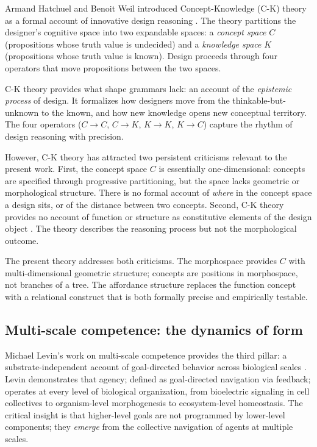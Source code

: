 Armand Hatchuel and Benoit Weil introduced Concept-Knowledge (C-K) theory as a formal account of innovative design reasoning \parencite{Hatchuel2003, Hatchuel2009}. The theory partitions the designer's cognitive space into two expandable spaces: a \textit{concept space} $C$ (propositions whose truth value is undecided) and a \textit{knowledge space} $K$ (propositions whose truth value is known). Design proceeds through four operators that move propositions between the two spaces.

C-K theory provides what shape grammars lack: an account of the \textit{epistemic process} of design. It formalizes how designers move from the thinkable-but-unknown to the known, and how new knowledge opens new conceptual territory. The four operators ($C \to C$, $C \to K$, $K \to K$, $K \to C$) capture the rhythm of design reasoning with precision.

However, C-K theory has attracted two persistent criticisms relevant to the present work. First, the concept space $C$ is essentially one-dimensional: concepts are specified through progressive partitioning, but the space lacks geometric or morphological structure. There is no formal account of \textit{where} in the concept space a design sits, or of the distance between two concepts. Second, C-K theory provides no account of function or structure as constitutive elements of the design object \parencite{Hatchuel2009}. The theory describes the reasoning process but not the morphological outcome.

The present theory addresses both criticisms. The morphospace provides $C$ with multi-dimensional geometric structure; concepts are positions in morphospace, not branches of a tree. The affordance structure replaces the function concept with a relational construct that is both formally precise and empirically testable.

\subsection{Multi-scale competence: the dynamics of form}

Michael Levin's work on multi-scale competence provides the third pillar: a substrate-independent account of goal-directed behavior across biological scales \parencite{Levin2022}. Levin demonstrates that agency; defined as goal-directed navigation via feedback; operates at every level of biological organization, from bioelectric signaling in cell collectives to organism-level morphogenesis to ecosystem-level homeostasis. The critical insight is that higher-level goals are not programmed by lower-level components; they \textit{emerge} from the collective navigation of agents at multiple scales.

